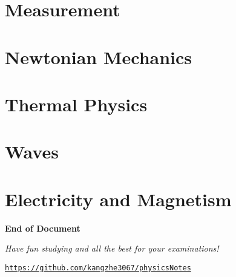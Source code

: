 \documentclass[a4paper,10pt]{article}
\begin{document}
\newpage
\begin{multicols}{2}
	
\part{Measurement}

\part{Newtonian Mechanics}






\part{Thermal Physics}




\part{Waves}




\part{Electricity and Magnetism}







\end{multicols}
\vspace{3em}
\begin{center}
{\Large \textbf{End of Document}}

\textit{Have fun studying and all the best for your examinations!}

\href{https://github.com/kangzhe3067/physicsNotes}{\color{gray} \texttt{https://github.com/kangzhe3067/physicsNotes}}
\end{center}
\end{document}

